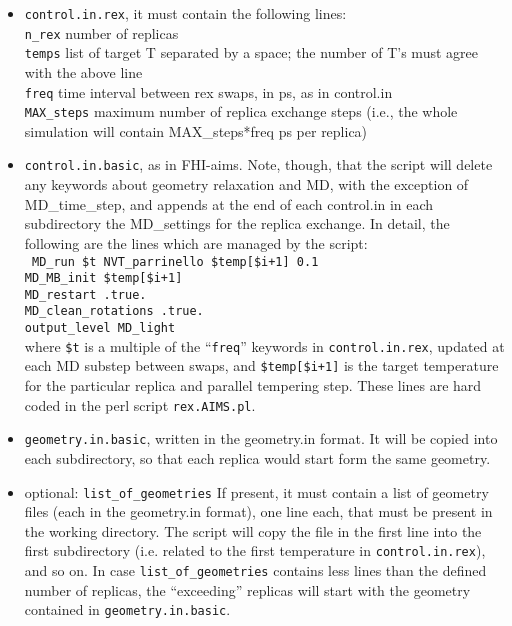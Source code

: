 \begin{itemize}

\item \texttt{control.in.rex}, it must contain the following lines:\\
 \texttt{n\_rex}  number of replicas\\
 \texttt{temps} list of target T separated by a space; the number of T's must agree with the above line\\
 \texttt{freq}  time interval between rex swaps, in ps, as in control.in\\
 \texttt{MAX\_steps} maximum number of replica exchange steps (i.e., the whole simulation will contain MAX\_steps*freq ps per replica)\\


 \item \texttt{control.in.basic}, as in FHI-aims. Note, though, that the script will delete any keywords about geometry relaxation and MD, with the exception of MD\_time\_step, and appends at the end of each control.in in each subdirectory the MD\_settings for the replica exchange. In detail, the following are the lines which are managed by the script:\\
\texttt{  MD\_run \$t NVT\_parrinello \$temp[\$i+1] 0.1 \\
  MD\_MB\_init \$temp[\$i+1] \\
  MD\_restart .true. \\
  MD\_clean\_rotations .true. \\
  output\_level MD\_light\\} 
where \texttt{\$t} is a multiple of the ``\texttt{freq}'' keywords in \texttt{control.in.rex}, updated at each MD substep between swaps, and \texttt{\$temp[\$i+1]} is the target temperature for the particular replica and parallel tempering step.
These lines are hard coded in the perl script \texttt{rex.AIMS.pl}.


\item \texttt{geometry.in.basic}, written in the geometry.in format. It will be copied into each subdirectory, so that each replica would start form the same geometry.


\item optional: \texttt{list\_of\_geometries}
If present, it must contain a list of geometry files (each in the geometry.in format), one line each, that must be present in the working directory. The script will copy the file in the first line into the first subdirectory (i.e. related to the first temperature in \texttt{control.in.rex}), and so on. In case \texttt{list\_of\_geometries} contains less lines than the defined number of replicas, the ``exceeding'' replicas will start with the geometry contained in \texttt{geometry.in.basic}.



\end{itemize}
